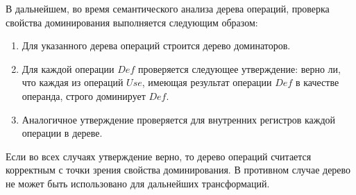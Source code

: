 В дальнейшем, во время семантического анализа дерева операций, проверка свойства доминирования выполняется следующим образом:

\begin{enumerate}
    \item Для указанного дерева операций строится дерево доминаторов.
    \item Для каждой операции \(Def\) проверяется следующее утверждение: верно ли, что каждая из операций \(Use\), имеющая результат операции \(Def\) в качестве операнда, строго доминирует \(Def\).
    \item Аналогичное утверждение проверяется для внутренних регистров каждой операции в дереве. 
\end{enumerate}

Если во всех случаях утверждение верно, то дерево операций считается корректным с точки зрения свойства доминирования.
В противном случае дерево не может быть использовано для дальнейших трансформаций.
